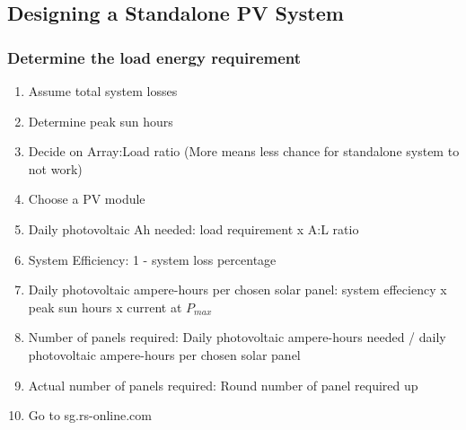\documentclass{article}
\begin{document}
\subsection{Designing a Standalone PV System}
\subsubsection{Determine the load energy requirement}
\begin{enumerate}
	\item Assume total system losses
	\item Determine peak sun hours
	\item Decide on Array:Load ratio (More means less chance for standalone system to not work)
	\item Choose a PV module
	\item Daily photovoltaic Ah needed: load requirement x A:L ratio
	\item System Efficiency: 1 - system loss percentage
	\item Daily photovoltaic ampere-hours per chosen solar panel: system effeciency x peak sun hours x current at $P_{max}$
	\item Number of panels required: Daily photovoltaic ampere-hours needed / daily photovoltaic ampere-hours per chosen solar panel
	\item Actual number of panels required: Round number of panel required up
	\item Go to sg.rs-online.com
\end{enumerate}
\end{document}
